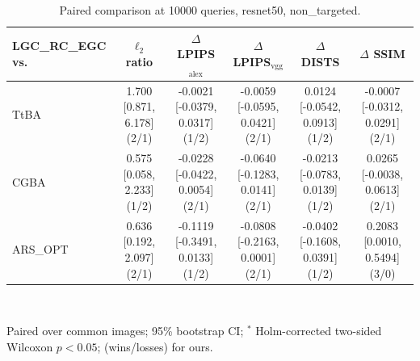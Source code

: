 \begin{table}[t]
\centering\footnotesize
\caption{Paired comparison at 10000 queries, resnet50, non\_targeted.}
\begin{tabular}{lccccc}
\toprule
LGC\_RC\_EGC vs. & $\ell_2$ ratio & $\Delta$ LPIPS$_{\mathrm{alex}}$ & $\Delta$ LPIPS$_{\mathrm{vgg}}$ & $\Delta$ DISTS & $\Delta$ SSIM \\
\midrule
TtBA & 1.700 [0.871, 6.178] (2/1) & -0.0021 [-0.0379, 0.0317] (1/2) & -0.0059 [-0.0595, 0.0421] (2/1) & 0.0124 [-0.0542, 0.0913] (1/2) & -0.0007 [-0.0312, 0.0291] (2/1) \\
CGBA & 0.575 [0.058, 2.233] (1/2) & -0.0228 [-0.0422, 0.0054] (2/1) & -0.0640 [-0.1283, 0.0141] (2/1) & -0.0213 [-0.0783, 0.0139] (1/2) & 0.0265 [-0.0038, 0.0613] (2/1) \\
ARS\_OPT & 0.636 [0.192, 2.097] (2/1) & -0.1119 [-0.3491, 0.0133] (1/2) & -0.0808 [-0.2163, 0.0001] (2/1) & -0.0402 [-0.1608, 0.0391] (1/2) & 0.2083 [0.0010, 0.5494] (3/0) \\
\bottomrule
\end{tabular}
\\[2pt]\parbox{\linewidth}{\scriptsize Paired over common images; 95\% bootstrap CI; $^{*}$ Holm-corrected two-sided Wilcoxon $p<0.05$; (wins/losses) for ours.}
\end{table}
